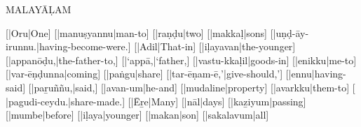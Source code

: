 




\overfullrule=0pt

\def\malstrut{\leavevmode\lower6pt\vbox to20pt{}}
\def\firststyle{\malstrut}
\def\secondstyle{\rm}
\def\thirdstyle{\it}

\raggedbottom
\emergencystretch=40pt
\parindent=0pt

\centerline{{\mmtr MALAY\=A\d LAM}}
\bigskip

\beginthreelines

[{\mm {}}|{\mmtr Oru}|One] [{\mm {}}|{\mmtr manu\d syannu}|man-to]
[{\mm {}}|{\mmtr ra\d n\d du}|two] [{\mm {}}|{\mmtr makka\d l}|sons]
[{\mm {}}|{\mmtr u\d n\d d-\=ay-irunnu.}|having-become-were.]
[{\mm {}}|{\mmtr Adil}|That-in] [{\mm {}}|{\mmtr i\d layavan}|the-younger]
[{\mm {}}|{\mmtr appan\=o\d du,}|the-father-to,]
[{}|{\mmtr `app\=a,}|`father,]
[{\mm {}}|{\mmtr vastu-kka\d lil}|goods-in] [{\mm {}}|{\mmtr enikku}|me-to]
[{\mm {}}|{\mmtr var-\=e\d n\d dunna}|coming] [{\mm {}}|{\mmtr pa\.ngu}|share]
[{\mm {}}|{\mmtr tar-\=e\d nam-\=e,'}|give-should,']
[{\mm {}}|{\mmtr ennu}|having-said] [{\mm {}}|{\mmtr pa\b ru\~n\~nu,}|said,]
[{\mm {}}|{\mmtr avan-um}|he-and] [{\mm {}}|{\mmtr mudaline}|property]
[{\mm {}}|{\mmtr avarkku}|them-to]
[{\mm {} }|{\mmtr pagudi-ceydu.}|share-made.]
[{\mm {}}|{\mmtr \=E\b re}|Many] [{\mm {}}|{\mmtr n\=al}|days]
[{\mm {}}|{\mmtr ka\b ziyum}|passing] [{\mm {}}|{\mmtr mumbe}|before]
[{\mm {}}|{\mmtr i\d laya}|younger] [{\mm {}}|{\mmtr makan}|son]
[{\mm {}}|{\mmtr sakalavum}|all]
